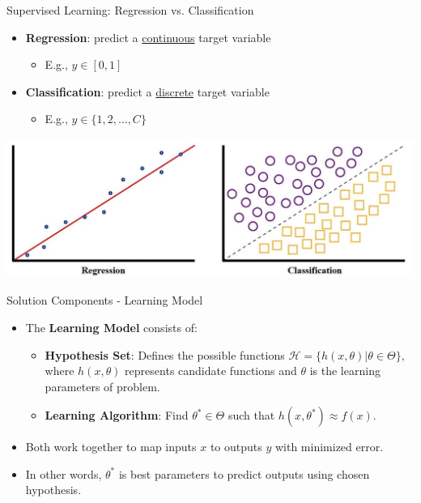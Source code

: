 \documentclass[serif, aspectratio=169]{beamer}
\begin{document}
    \begin{frame}{Supervised Learning: Regression vs. Classification}

        \begin{itemize}
            \item \textbf{Regression}: predict a \underline{continuous} target variable
            \begin{itemize}
                \item E.g., $y \in [0, 1]$
            \end{itemize}
            \item \textbf{Classification}: predict a \underline{discrete} target variable
            \begin{itemize}
                \item E.g., $y \in \{1, 2, \ldots, C\}$
            \end{itemize}
        \end{itemize}

        \centering
        \includegraphics[width=0.8\linewidth]{pic/regressionVSclassification.jpg}



    \end{frame}



    \begin{frame}{Solution Components - Learning Model}
        \begin{itemize}
            \item The \textbf{Learning Model} consists of:
            \begin{itemize}
                \item \textbf{Hypothesis Set}: Defines the possible functions \( \mathcal{H} = \{h(x, \theta) | \theta \in \Theta\} \), where \( h(x, \theta) \) represents candidate functions and \( \theta \) is the learning parameters of problem.
                \item \textbf{Learning Algorithm}: Find \( \theta^* \in \Theta \) such that \( h(x, \theta^*) \approx f(x) \).
            \end{itemize}
            \item Both work together to map inputs \(x\) to outputs \(y\) with minimized error.
            \item In other words, \( \theta^* \) is best parameters to predict outputs using chosen hypothesis.
        \end{itemize}
        \vspace{0.5cm}
    \end{frame}
\end{document}
